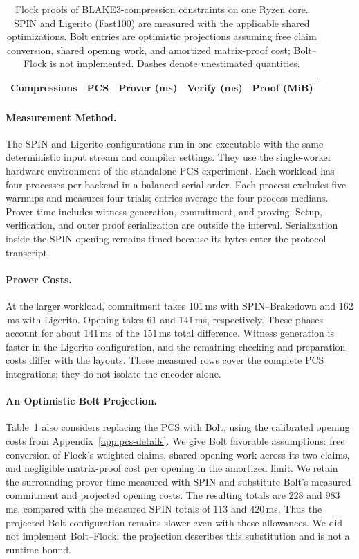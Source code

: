 \begin{table}[tb]
\centering
\caption{Flock proofs of BLAKE3-compression constraints on one Ryzen
core. SPIN and Ligerito (Fast100) are measured with the applicable shared
optimizations. Bolt entries are optimistic projections assuming free claim
conversion, shared opening work, and amortized matrix-proof cost;
Bolt--Flock is not implemented. Dashes denote unestimated quantities.}
\label{tab:spin-flock}
\small
\begin{tabular}{@{}rlrrr@{}}
\toprule
Compressions & PCS & Prover (ms) & Verify (ms) & Proof (MiB) \\
\midrule

\end{tabular}
\end{table}

\paragraph{Measurement Method.}
The SPIN and Ligerito configurations run in one executable with the same deterministic
input stream and compiler settings. They use the single-worker hardware
environment of the standalone PCS experiment. Each workload has four processes per backend
in a balanced serial order. Each process excludes five warmups and
measures four trials; entries average the four process medians.
Prover time includes witness generation, commitment, and proving. Setup,
verification, and outer proof serialization are outside the interval.
Serialization inside the SPIN opening remains timed because its bytes
enter the protocol transcript.

\paragraph{Prover Costs.}
At the larger workload, commitment takes $101$\,ms with SPIN--Brakedown
and $162$\,ms with Ligerito. Opening takes $61$ and $141$\,ms,
respectively. These phases account for about $141$\,ms of the $151$\,ms total
difference. Witness generation is faster in the Ligerito configuration,
and the remaining checking and preparation costs differ with the layouts.
These measured rows cover the complete PCS integrations; they do not isolate
the encoder alone.

\paragraph{An Optimistic Bolt Projection.}
Table~\ref{tab:spin-flock} also considers replacing the PCS with
Bolt, using the calibrated opening costs from Appendix~\ref{app:pcs-details}.
We give Bolt favorable assumptions: free conversion of Flock's weighted
claims, shared opening work across its two claims, and negligible
matrix-proof cost per opening in the amortized limit. We retain the
surrounding prover time measured with SPIN and substitute Bolt's measured
commitment and projected opening costs. The resulting totals are
$228$ and $983$\,ms, compared with the measured SPIN totals of $113$
and $420$\,ms. Thus the projected Bolt configuration remains slower even
with these allowances. We did not implement Bolt--Flock; the projection
describes this substitution and is not a runtime bound.

